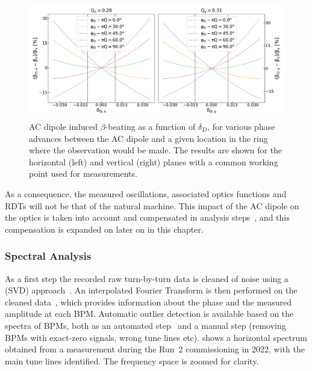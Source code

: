 \begin{figure}[!htb]
  \centering
  \includegraphics*[width=0.99\linewidth]{Figures/Optics_Measurements_Corrections_at_LHC/bbeatings_acdipole.pdf}
  \caption{AC dipole induced \(\beta\)-beating as a function of \(\delta_D\), for various phase advances between the AC dipole and a given location in the ring where the observation would be made. The results are shown for the horizontal (left) and vertical (right) planes with a common working point used for measurements.}
  \label{figure:ac_dipole_induced_beta_beating}
\end{figure}

As a consequence, the measured oscillations, associated optics functions and \glspl{RDT} will not be that of the natural machine.
This impact of the AC dipole on the optics is taken into account and compensated in analysis steps~\cite{IPAC:Miyamoto:Measurement_Coupling_RDTs_LHC_AC_Dipole}, and this compensation is expanded on later on in this chapter.

\subsubsection*{Spectral Analysis}

As a first step the recorded raw turn-by-turn data is cleaned of noise using a  (SVD) approach~\cite{PRAB:Calaga:Statistical_Analysis_RHIC_BPMs}.
An interpolated Fourier Transform is then performed on the cleaned data~\cite{PHD:Malina,IPAC:Malina:Harpy_Fast_Simple}, which provides information about the phase and the measured amplitude at each BPM.
Automatic outlier detection is available based on the spectra of BPMs, both as an automated step~\cite{PRAB:Fol:Detection_Faulty_BPMs} and a manual step (removing BPMs with exact-zero signals, wrong tune lines etc).
 shows a horizontal spectrum obtained from a measurement during the Run~\num{2} commissioning in \num{2022}, with the main tune lines identified.
The frequency space is zoomed for clarity.

